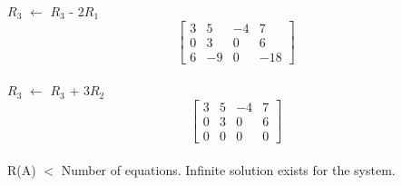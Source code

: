 \documentclass{article}
\begin{document}
$R_3$ $\leftarrow$ $R_3$ - $2R_1$\\

$$
  \left[\begin{array}{rrr|r}
    3 & 5 & -4 & 7 \\
    0 & 3 & 0 & 6 \\
    6 & -9 & 0 & -18
  \end{array}\right]
$$ \\

$R_3$ $\leftarrow$ $R_3$ + $3R_2$\\

$$
  \left[\begin{array}{rrr|r}
    3 & 5 & -4 & 7 \\
    0 & 3 & 0 & 6 \\
    0 & 0 & 0 & 0
  \end{array}\right]
$$ \\

R(A) $<$  Number of equations. Infinite solution exists for the system. 
\end{document}
